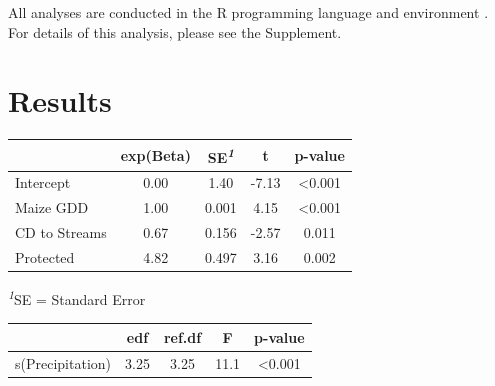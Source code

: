 \documentclass[
  number,
  preprint,
  3p]{elsarticle}
\begin{document}
All analyses are conducted in the R programming language and environment
\citep{rcoreteam2022}. For details of this analysis, please see the
Supplement.

\hypertarget{results}{%
\section{Results}\label{results}}

\begin{table}

\caption{\label{tbl-results}Model
Results}\begin{minipage}[t]{\linewidth}

{\centering 

\setlength{\LTpost}{0mm}
\begin{longtable}{lcccc}
\tabularnewline

\toprule
 & \textbf{exp(Beta)} & \textbf{SE}\textsuperscript{\textit{1}} & \textbf{t} & \textbf{p-value} \\ 
\midrule
Intercept & 0.00 & 1.40 & -7.13 & <0.001 \\ 
Maize GDD & 1.00 & 0.001 & 4.15 & <0.001 \\ 
CD to Streams & 0.67 & 0.156 & -2.57 & 0.011 \\ 
Protected & 4.82 & 0.497 & 3.16 & 0.002 \\ 
\bottomrule
\end{longtable}
\begin{minipage}{\linewidth}
\textsuperscript{\textit{1}}SE = Standard Error\\
\end{minipage}

}

\end{minipage}%
\newline
\begin{minipage}[t]{\linewidth}

{\centering 

\begin{longtable}{lcccc}
\tabularnewline

\toprule
 & \textbf{edf} & \textbf{ref.df} & \textbf{F} & \textbf{p-value} \\ 
\midrule
s(Precipitation) & 3.25 & 3.25 & 11.1 & <0.001 \\ 
\bottomrule
\end{longtable}

}

\end{minipage}%

\end{table}
\end{document}
